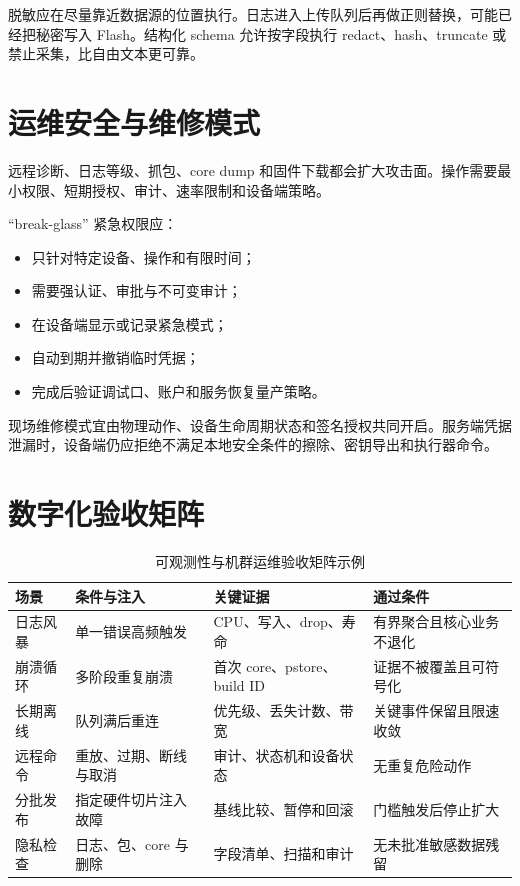 脱敏应在尽量靠近数据源的位置执行。日志进入上传队列后再做正则替换，可能已经把秘密写入 Flash。结构化 schema 允许按字段执行 redact、hash、truncate 或禁止采集，比自由文本更可靠。

\section{运维安全与维修模式}

远程诊断、日志等级、抓包、core dump 和固件下载都会扩大攻击面。操作需要最小权限、短期授权、审计、速率限制和设备端策略。

“break-glass” 紧急权限应：

\begin{itemize}
  \item 只针对特定设备、操作和有限时间；
  \item 需要强认证、审批与不可变审计；
  \item 在设备端显示或记录紧急模式；
  \item 自动到期并撤销临时凭据；
  \item 完成后验证调试口、账户和服务恢复量产策略。
\end{itemize}

现场维修模式宜由物理动作、设备生命周期状态和签名授权共同开启。服务端凭据泄漏时，设备端仍应拒绝不满足本地安全条件的擦除、密钥导出和执行器命令。

\section{数字化验收矩阵}

\begin{table}[H]
  \centering
  \caption{可观测性与机群运维验收矩阵示例}
  \begin{tabular}{p{28mm}p{41mm}p{39mm}p{32mm}}
    \hline
    场景 & 条件与注入 & 关键证据 & 通过条件 \\
    \hline
    日志风暴 & 单一错误高频触发 & CPU、写入、drop、寿命 & 有界聚合且核心业务不退化 \\
    崩溃循环 & 多阶段重复崩溃 & 首次 core、pstore、build ID & 证据不被覆盖且可符号化 \\
    长期离线 & 队列满后重连 & 优先级、丢失计数、带宽 & 关键事件保留且限速收敛 \\
    远程命令 & 重放、过期、断线与取消 & 审计、状态机和设备状态 & 无重复危险动作 \\
    分批发布 & 指定硬件切片注入故障 & 基线比较、暂停和回滚 & 门槛触发后停止扩大 \\
    隐私检查 & 日志、包、core 与删除 & 字段清单、扫描和审计 & 无未批准敏感数据残留 \\
    \hline
  \end{tabular}
\end{table}

